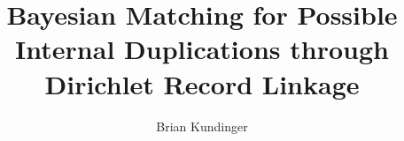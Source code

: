 \documentclass[12pt,letterpaper]{article}
\title{Bayesian Matching for Possible Internal Duplications through Dirichlet Record Linkage}
\author{Brian Kundinger}
\newcommand{\1}[1]{\mathbb{I}\!\left[#1\right]} %
\def\spacingset#1{\renewcommand{\baselinestretch}%
  {#1}\small\normalsize} \spacingset{1}
\begin{document}
%
%
\spacingset{1.5}


\end{document}
